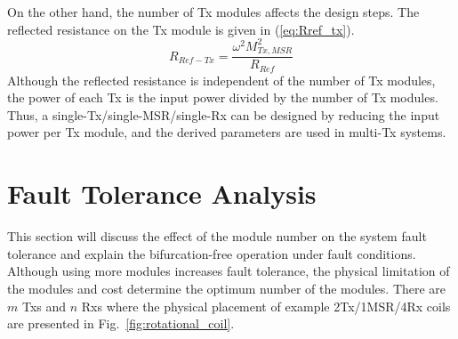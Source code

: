 \documentclass[journal]{IEEEtran}
\begin{document}
On the other hand, the number of Tx modules affects the design steps. The reflected resistance on the Tx module is given in (\ref{eq:Rref_tx}).
\begin{equation}
    \label{eq:Rref_tx}
      R_{Ref-Tx} = \frac{\omega^2M_{Tx,MSR}^2}{R_{Ref}}
\end{equation}
Although the reflected resistance is independent of the number of Tx modules, the power of each Tx is the input power divided by the number of Tx modules. 
Thus, a single-Tx/single-MSR/single-Rx can be designed by reducing the input power per Tx module, and the derived parameters are used in multi-Tx systems. 

\section{Fault Tolerance Analysis}
This section will discuss the effect of the module number on the system fault tolerance and explain the bifurcation-free operation under fault conditions.
Although using more modules increases fault tolerance, the physical limitation of the modules and cost determine the optimum number of the modules. 
There are $m$ Txs and $n$ Rxs where the physical placement of example 2Tx/1MSR/4Rx coils are presented in Fig.~\ref{fig:rotational_coil}.
\end{document}
